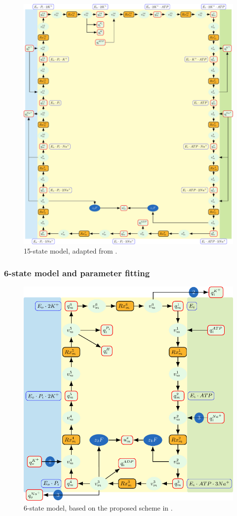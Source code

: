 \documentclass{biophys-new}
\begin{document}
\cite{pan_cardiac_2020}


\begin{figure}
\caption{15-state model, adapted from \cite{pan_cardiac_2020}.}
\centering
\includegraphics[width=1\linewidth]{15state.pdf}
\end{figure}

\subsubsection{6-state model and parameter fitting}

\cite{nguyen_structural_2022}
\begin{figure}
\caption{6-state model, based on the proposed scheme in \cite{nguyen_structural_2022}.}
\centering
\includegraphics[width=0.7\linewidth]{6state_2.pdf}
\end{figure}

\end{document}
